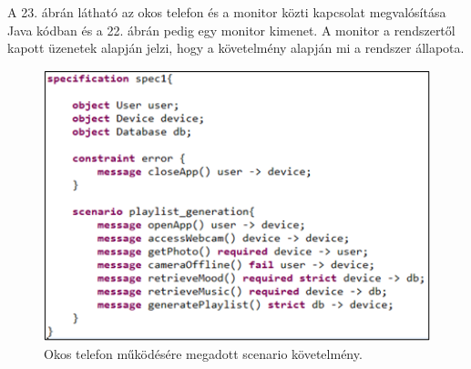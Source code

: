 A 23. ábrán látható az okos telefon és a monitor közti kapcsolat megvalósítása Java kódban és a 22. ábrán pedig egy monitor kimenet. A monitor a rendszertől kapott üzenetek alapján jelzi, hogy a követelmény alapján mi a rendszer állapota.

\begin{figure}[!ht]
    \centering
    \includegraphics[width=150mm, keepaspectratio]{figures/19abra.png}
    \caption{Okos telefon működésére megadott scenario követelmény.}
\end{figure}


